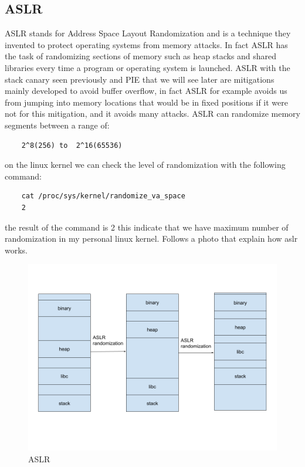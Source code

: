 \documentclass{report}
\begin{document}
    \subsection{ASLR}
    ASLR stands for Address Space Layout Randomization and is a technique they invented to protect operating systems from memory attacks.\newline
    In fact ASLR has the task of randomizing sections of memory such as heap stacks and shared libraries every time a program or operating system is launched.\newline
    ASLR with the stack canary seen previously and PIE that we will see later are mitigations mainly developed to avoid buffer overflow, in fact ASLR for example avoids us from jumping into memory locations that would be in fixed positions if it were not for this mitigation, and it avoids many attacks.\newline
    ASLR can randomize memory segments between a range of:
    \begin{verbatim} 
    2^8(256) to  2^16(65536)
    \end{verbatim}
    on the linux kernel we can check the level of randomization with the following command:
    \begin{verbatim}
    cat /proc/sys/kernel/randomize_va_space
    2
    \end{verbatim}
    the result of the command is 2 this indicate that we have maximum number of randomization in my personal linux kernel.\newline
    Follows a photo that explain how aslr works.
    \begin{figure}[h]
        \centering
        \includegraphics[width=0.8\linewidth]{aslr_explanation.png}
        \caption{ASLR}
        \label{fig:aslr }
    \end{figure}
    \clearpage
\end{document}
